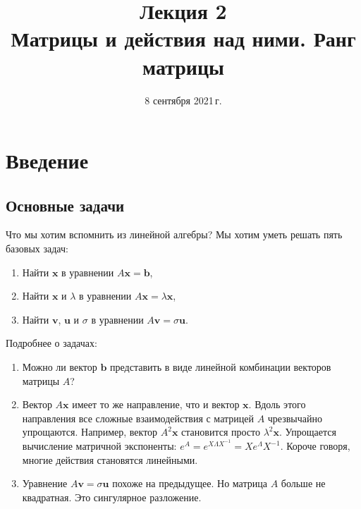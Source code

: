 \documentclass[11pt,a4paper]{article}
\title{
      {\Large Лекция 2} \\
      Матрицы и действия над ними. Ранг матрицы
    }
\date{8 сентября 2021\,г.}
\begin{document}
\maketitle
\thispagestyle{empty}
\tableofcontents
\pagebreak


\hypertarget{ux432ux432ux435ux434ux435ux43dux438ux435}{%
\section{Введение}\label{ux432ux432ux435ux434ux435ux43dux438ux435}}

\hypertarget{ux43eux441ux43dux43eux432ux43dux44bux435-ux437ux430ux434ux430ux447ux438}{%
\subsection{Основные
задачи}\label{ux43eux441ux43dux43eux432ux43dux44bux435-ux437ux430ux434ux430ux447ux438}}

Что мы хотим вспомнить из линейной алгебры? Мы хотим уметь решать пять
базовых задач:

\begin{enumerate}
\def\labelenumi{\arabic{enumi}.}
\item
  Найти \(\mathbf{x}\) в уравнении \(A\mathbf{x} = \mathbf{b}\),
\item
  Найти \(\mathbf{x}\) и \(\lambda\) в уравнении
  \(A\mathbf{x} = \lambda \mathbf{x}\),
\item
  Найти \(\mathbf{v}\), \(\mathbf{u}\) и \(\sigma\) в уравнении
  \(A\mathbf{v} = \sigma \mathbf{u}\).
\end{enumerate}

Подробнее о задачах:
\begin{enumerate}
\item
  Можно ли вектор \(\mathbf{b}\) представить в виде линейной комбинации
  векторов матрицы \(A\)?
\item
  Вектор \(A\mathbf{x}\) имеет то же направление, что и вектор
  \(\mathbf{x}\). Вдоль этого направления все сложные взаимодействия с
  матрицей \(A\) чрезвычайно упрощаются. Например, вектор
  \(A^2 \mathbf{x}\) становится просто \(\lambda^2 \mathbf{x}\).
  Упрощается вычисление матричной экспоненты:
  \(e^{A} = e^{X \Lambda X^{-1}} = X e^{\Lambda} X^{-1}\). Короче
  говоря, многие действия становятся линейными.
\item
  Уравнение \(A\mathbf{v} = \sigma \mathbf{u}\) похоже на предыдущее. Но
  матрица \(A\) больше не квадратная. Это сингулярное разложение.
\end{enumerate}
\end{document}
